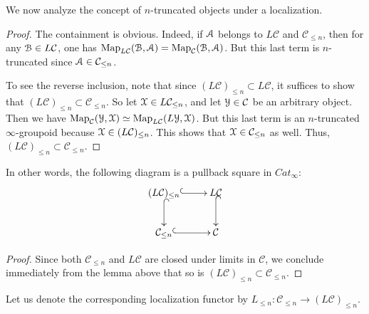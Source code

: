 We now analyze the concept of $n$-truncated objects under a localization. 
\begin{proof}
 The containment is obvious. Indeed, if $\EuScript{A}$ belongs to $ L\mathcal{C}$ and $ \mathcal{C}_{\leq n}$, then for any $\EuScript{B}\in  L\mathcal{C}$, one has $ \text{Map}_{ L\mathcal{C}}(\EuScript{B},\EuScript{A})= \text{Map}_{ \mathcal{C}}(\EuScript{B},\EuScript{A})$. But this last term is $n$-truncated since $\EuScript{A}\in \mathcal{C}_{\leq n}$. 
 
 To see the reverse inclusion, note that since $(L\mathcal{C})_{\leq n}\subset L\mathcal{C}$, it suffices to show that $(L\mathcal{C})_{\leq n}\subset \mathcal{C}_{\leq n}$. So let $\EuScript{X}\in L\mathcal{C}_{\leq n}$, and let $\EuScript{Y}\in \mathcal{C}$ be an arbitrary object. Then we have $\text{Map}_{ \mathcal{C}}(\EuScript{Y},\EuScript{X})\simeq \text{Map}_{ L\mathcal{C}}(L\EuScript{Y},\EuScript{X})$. But this last term is an $n$-truncated $\infty$-groupoid because $\EuScript{X}\in (L\mathcal{C})_{\leq n}$. This shows that $\EuScript{X}\in \mathcal{C}_{\leq n}$ as well. Thus, $(L\mathcal{C})_{\leq n}\subset \mathcal{C}_{\leq n}$. 
\end{proof}
In other words, the following diagram is a pullback square in $Cat_\infty$:
\[
\xymatrix{
(L\mathcal{C})_{\leq n}\ar@{^(->}[r]\ar@{^(->}[d]&
L\mathcal{C}\ar@{^(->}[d]\\
\mathcal{C}_{\leq n}\ar@{^(->}[r]&\mathcal{C}
}
\]
   
\begin{proof}
    Since both $\mathcal{C}_{\leq n}$ and $L\mathcal{C}$ are closed under limits in $\mathcal{C}$, we conclude immediately from the lemma above that so is $(L\mathcal{C})_{\leq n}\subset \mathcal{C}_{\leq n}$. 
\end{proof}
Let us denote the corresponding localization functor by $L_{\leq n}:\mathcal{C}_{{\leq n} }\to(L\mathcal{C})_{\leq n}$.


